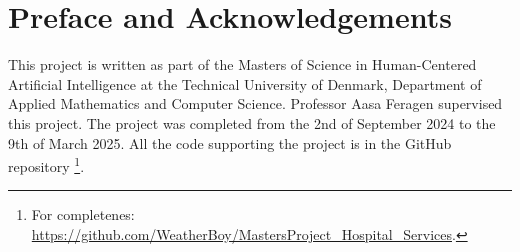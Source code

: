 \section*{Preface and Acknowledgements}
This project is written as part of the Masters of Science in Human-Centered Artificial Intelligence at the Technical University of Denmark, Department of Applied Mathematics and Computer Science. Professor Aasa Feragen supervised this project. The project was completed from the 2nd of September 2024 to the 9th of March 2025. All the code supporting the project is in the GitHub repository \footnote{For completenes: \href{https://github.com/WeatherBoy/MastersProject_Hospital_Services}{https://github.com/WeatherBoy/MastersProject\_Hospital\_Services}.}.